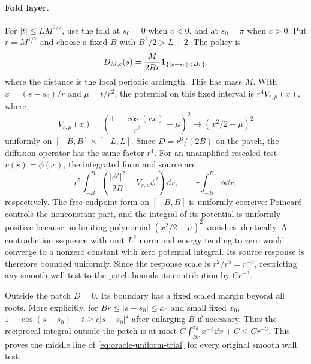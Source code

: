 \paragraph{Fold layer.}
For $|t|\le LM^{2/7}$, use the fold at $s_0=0$ when $c<0$, and at
$s_0=\pi$ when $c>0$. Put $r=M^{1/7}$ and choose a fixed $B$ with
$B^2/2>L+2$. The policy is
\begin{equation}\label{eq:oracle-fold-policy}
 D_{M,c}(s)=\frac{M}{2Br}\mathbf 1_{\{|s-s_0|<Br\}},
\end{equation}
where the distance is the local periodic arclength. This has mass $M$.
With $x=(s-s_0)/r$ and $\mu=t/r^2$, the potential on this fixed
interval is $r^4V_{r,\mu}(x)$, where
\[
 V_{r,\mu}(x)=\left(\frac{1-\cos(rx)}{r^2}-\mu\right)^2
 \longrightarrow (x^2/2-\mu)^2
\]
uniformly on $[-B,B]\times[-L,L]$. Since $D=r^6/(2B)$ on the patch,
the diffusion operator has the same factor $r^4$. For an unamplified
rescaled test $v(s)=\phi(x)$, the integrated form and source are
\[
 r^5\int_{-B}^B\left(\frac{|\phi'|^2}{2B}
                         +V_{r,\mu}\phi^2\right)\dd x,
 \qquad r\int_{-B}^B\phi\dd x,
\]
respectively.
The free-endpoint form on $[-B,B]$ is uniformly coercive: Poincar\'e
controls the nonconstant part, and the integral of its potential is
uniformly positive because no limiting polynomial
$(x^2/2-\mu)^2$ vanishes identically. A contradiction sequence with
unit $L^2$ norm and energy tending to zero would converge to a
nonzero constant with zero potential integral. Its source response
is therefore bounded uniformly. Since the response scale is
$r^2/r^5=r^{-3}$, restricting any smooth wall test to the patch bounds
its contribution by $Cr^{-3}$.

Outside the patch $D=0$. Its boundary has a fixed scaled margin
beyond all roots. More explicitly, for $Br\le|s-s_0|\le x_0$ and
small fixed $x_0$, $1-\cos(s-s_0)-t\ge c|s-s_0|^2$ after enlarging
$B$ if necessary. Thus the reciprocal integral outside the patch is
at most $C\int_{Br}^{x_0}x^{-4}\dd x+C\le Cr^{-3}$.
This proves the middle line of \eqref{eq:oracle-uniform-trial}
for every original smooth wall test.

